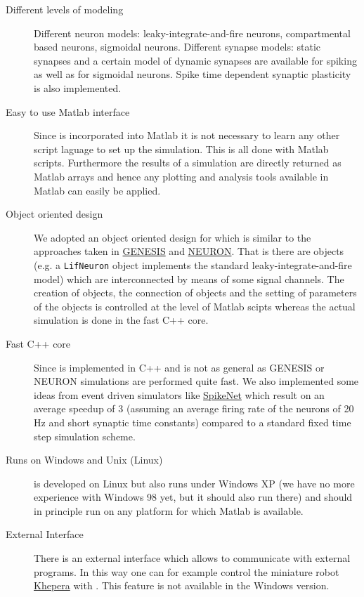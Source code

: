 \begin{description}
  
\item[Different levels of modeling] Different neuron models:
  leaky-integrate-and-fire neurons, compartmental based neurons,
  sigmoidal neurons. Different synapse models: static synapses and a
  certain model of dynamic synapses are available for spiking as well
  as for sigmoidal neurons. Spike time dependent synaptic plasticity
  is also implemented.

  
\item[Easy to use Matlab interface] Since \csim is incorporated into
  Matlab it is not necessary to learn any other script laguage to set
  up the simulation. This is all done with Matlab scripts. Furthermore
  the results of a simulation are directly returned as Matlab arrays
  and hence any plotting and analysis tools available in Matlab can
  easily be applied.
  
\item[Object oriented design] We adopted an object oriented design for
  \csim which is similar to the approaches taken in
  \href{http://www.bbb.caltech.edu/GENESIS/genesis.html}{GENESIS} and
  \href{http://www.neuron.yale.edu}{NEURON}. That is there are objects
  (e.g. a \texttt{LifNeuron} object implements the standard
  leaky-integrate-and-fire model) which are interconnected by means of
  some signal channels. The creation of objects, the connection of
  objects and the setting of parameters of the objects is controlled
  at the level of Matlab scipts whereas the actual simulation is done
  in the fast C++ core.

  
\item[Fast C++ core] Since \csim is implemented in C++ and is not as
  general as GENESIS or NEURON simulations are performed quite fast.
  We also implemented some ideas from event driven simulators like
  \href{http://www.cnl.salk.edu/~arno/spikenet/}{SpikeNet} which
  result on an average speedup of 3 (assuming an average firing rate
  of the neurons of 20\,Hz and short synaptic time constants) compared
  to a standard fixed time step simulation scheme.
  
\item[Runs on Windows and Unix (Linux)] \csim is developed on Linux but also
  runs under Windows XP (we have no more experience with Windows 98 yet, but
  it should also run there) and should in principle run on any platform for
  which Matlab is available.
  
\item[External Interface] There is an external interface which allows \csim to
  communicate with external programs. In this way one can for example control
  the miniature robot
  \href{http://www.k-team.com/robots/khepera/index.html}{Khepera} with \csim.
  This feature is not available in the Windows version.

\end{description}

